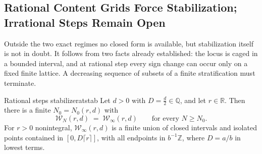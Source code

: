 \documentclass[11pt,letterpaper]{article}
\newcommand{\Zint}{\mathbb{Z}}
\newcommand{\Rr}{\mathbb{R}}
\newcommand{\Qq}{\mathbb{Q}}
\begin{document}
\subsection{Rational Content Grids Force Stabilization; Irrational Steps
  Remain Open}
\label{sec:nonintegral}

Outside the two exact regimes no closed form is available, but stabilization
itself is not in doubt. It follows from two facts already established: the locus
is caged in a bounded interval, and at rational step every sign change can occur
only on a fixed finite lattice. A decreasing sequence of subsets of a finite
stratification must terminate.

\begin{theorem}{Rational steps stabilize}{ratstab}
Let $d>0$ with $D=\tfrac d2\in\Qq$, and let $r\in\Rr$. Then there is a finite
$N_0=N_0(r,d)$ with
\begin{equation}
  \mathcal{W}_N(r,d)\;=\;\mathcal{W}_\infty(r,d)
  \qquad\text{for every } N\ge N_0 .
  \label{eq:ratstab}
\end{equation}
For $r>0$ nonintegral, $\mathcal{W}_\infty(r,d)$ is a finite union of closed
intervals and isolated points contained in $[0,D\lceil r\rceil]$, with all
endpoints in $b^{-1}\Zint$, where $D=a/b$ in lowest terms.
\end{theorem}
\end{document}
